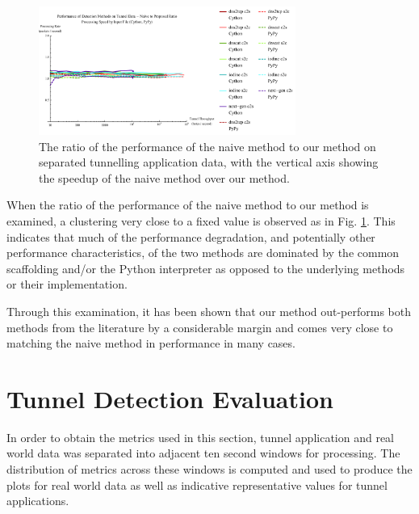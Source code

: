 \documentclass{llncs}
\begin{document}
\begin{figure}[h] \centering
\includegraphics[width=0.75\textwidth]{../figures/ppia-naive2proposed.pdf}
\caption[Performance Ratio of the Naive Method to the our Method on Tunnel
Data by Python Interpreter]{The ratio of the performance of the naive method to
our method on separated tunnelling application data, with the vertical
axis showing the speedup of the naive method over our method.}
\label{ppia-naive2proposed} \end{figure}

When the ratio of the performance of the naive method to our method is
examined, a clustering very close to a fixed value is observed as in Fig.
\ref{ppia-naive2proposed}. This indicates that much of the performance
degradation, and potentially other performance characteristics, of the two
methods are dominated by the common scaffolding and/or the Python interpreter as
opposed to the underlying methods or their implementation.

Through this examination, it has been shown that our method
out-performs both methods from the literature by a considerable margin and comes
very close to matching the naive method in performance in many cases.

\section{Tunnel Detection Evaluation}
\label{chap-evaluation}
\label{tunnel-detection-performance}

In order to obtain the metrics used in this section, tunnel application and real
world data was separated into adjacent ten second windows for processing. The
distribution of metrics across these windows is computed and used to produce the
plots for real world data as well as indicative representative values for tunnel
applications.
\end{document}
